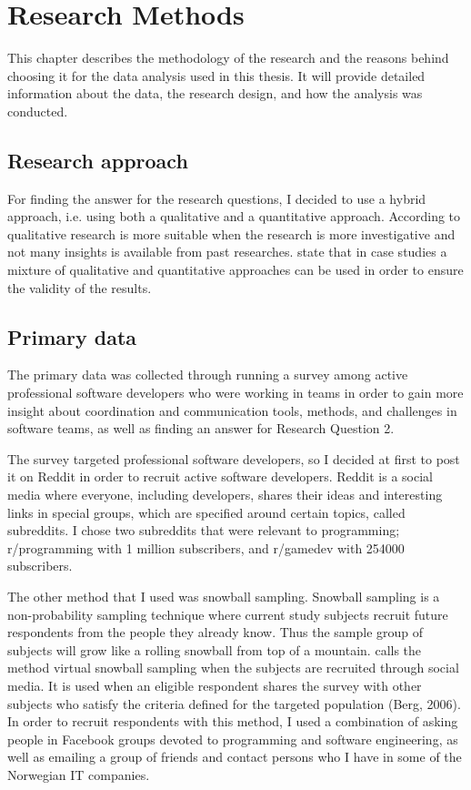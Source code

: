 \chapter{Research Methods}
This chapter describes the methodology of the research and the reasons behind choosing it for the data analysis used in this thesis. It will provide detailed information about the data, the research design, and how the analysis was conducted.

\section{Research approach}
For finding the answer for the research questions, I decided to use a hybrid approach, i.e. using both a qualitative and a quantitative approach. According to \citet{Ghauri2010} qualitative research is more suitable when the research is more investigative and not many insights is available from past researches. 
\citet{ Stray2012a} state that in case studies a mixture of qualitative and quantitative approaches can be used in order to ensure the validity of the results.  

\section{Primary data}
The primary data was collected through running a survey among active professional software developers who were working in teams in order to gain more insight about coordination and communication tools, methods, and challenges in software teams, as well as finding an answer for Research Question 2.

The survey targeted professional software developers, so I decided at first to post it on Reddit in order to recruit active software developers. Reddit is a social media where everyone, including developers, shares their ideas and interesting links in special groups, which are specified around certain topics, called subreddits. I chose two subreddits that were relevant to programming; r/programming with 1 million subscribers, and r/gamedev with 254000 subscribers.

The other method that I used was snowball sampling. Snowball sampling is a non-probability sampling technique where current study subjects recruit future respondents from the people they already know. Thus the sample group of subjects will grow like a rolling snowball from top of a mountain. \citet{Baltar2012} calls the method virtual snowball sampling when the subjects are recruited through social media. It is used when an eligible respondent shares the survey with other subjects who satisfy the criteria defined for the targeted population (Berg, 2006). 
In order to recruit respondents with this method, I used a combination of asking people in Facebook groups devoted to programming and software engineering, as well as emailing a group of friends and contact persons who I have in some of the Norwegian IT companies.

